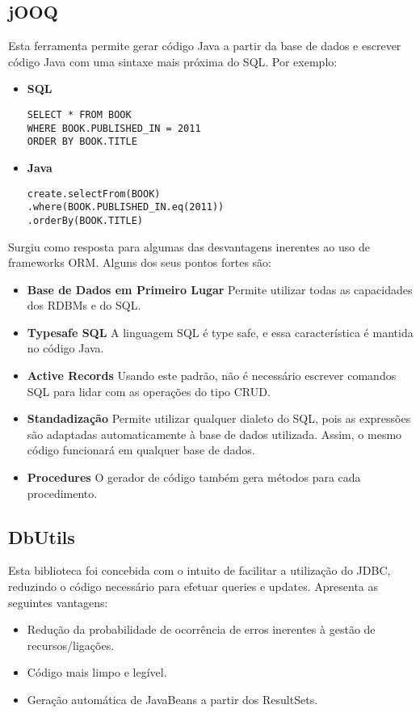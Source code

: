\subsection{jOOQ}
Esta ferramenta permite gerar código Java a partir da base de dados e escrever código Java com uma sintaxe mais próxima do SQL. Por exemplo:\par
\begin{itemize}
\item \textbf{SQL}
\begin{verbatim}
SELECT * FROM BOOK
WHERE BOOK.PUBLISHED_IN = 2011
ORDER BY BOOK.TITLE
\end{verbatim}
\item \textbf{Java}
\begin{verbatim}
create.selectFrom(BOOK)
.where(BOOK.PUBLISHED_IN.eq(2011))
.orderBy(BOOK.TITLE)
\end{verbatim}
\end{itemize}
Surgiu como resposta para algumas das desvantagens inerentes ao uso de frameworks ORM. Alguns dos seus pontos fortes são:
\begin{itemize}
\item \textbf{Base de Dados em Primeiro Lugar} Permite utilizar todas as capacidades dos RDBMs e do SQL.
\item \textbf{Typesafe SQL} A linguagem SQL é type safe, e essa característica é mantida no código Java.
\item \textbf{Active Records} Usando este padrão, não é necessário escrever comandos SQL para lidar com as operações do tipo CRUD.
\item \textbf{Standadização} Permite utilizar qualquer dialeto do SQL, pois as expressões são adaptadas automaticamente à base de dados utilizada. Assim, o mesmo código funcionará em qualquer base de dados.
\item \textbf{Procedures} O gerador de código também gera métodos para cada procedimento.
\end{itemize}
\subsection{DbUtils}
Esta biblioteca foi concebida com o intuito de facilitar a utilização do JDBC, reduzindo o código necessário para efetuar queries e updates. Apresenta as seguintes vantagens:
\begin{itemize}
\item Redução da probabilidade de ocorrência de erros inerentes à gestão de recursos/ligações.
\item Código mais limpo e legível.
\item Geração automática de JavaBeans a partir dos ResultSets.
\end{itemize}
